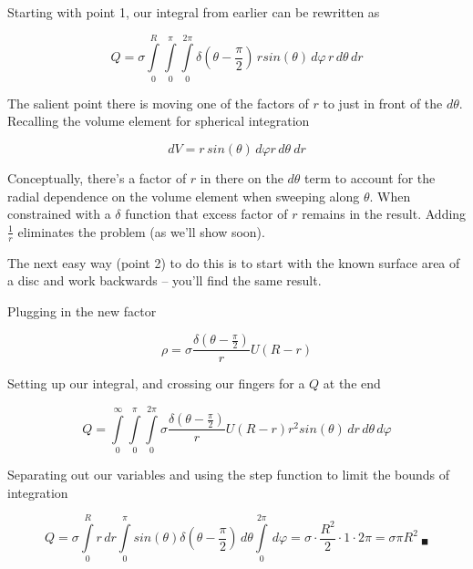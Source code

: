 Starting with point 1, our integral from earlier can be rewritten as 

\begin{equation}
  Q =
  \sigma
  \int\limits_0^R
  \int\limits_0^\pi
  \int\limits_0^{2\pi}
  \delta(\theta - \frac \pi 2)
  \,r sin(\theta) \, d\varphi
  \,r \, d\theta
  \, dr
\end{equation}

The salient point there is moving one of the factors of $r$ to just in
front of the $d\theta$.  Recalling the volume element for spherical
integration

\begin{equation}
  dV = r\,sin(\theta)\,d\varphi r\,d\theta\ dr
\end{equation}

Conceptually, there's a factor of $r$ in there on the $d\theta$ term
to account for the radial dependence on the volume element when
sweeping along $\theta$. When constrained with a $\delta$ function
that excess factor of $r$ remains in the result.  Adding $\frac 1 r$
eliminates the problem (as we'll show soon).

The next easy way (point 2) to do this is to start with the known
surface area of a disc and work backwards -- you'll find the same
result.

Plugging in the new factor

\begin{equation}
  \rho = \sigma \frac{\delta(\theta - \frac \pi 2)}{r} U(R - r)
\end{equation}

Setting up our integral, and crossing our fingers for a $Q$ at the end

\begin{equation}
  Q =
  \int\limits_0^\infty
  \int\limits_0^\pi
  \int\limits_0^{2\pi}
  \sigma \frac{\delta(\theta - \frac \pi 2)}{r} U(R - r)
  r^2sin(\theta)
  \, dr
  \, d\theta
  \, d\varphi
\end{equation}

Separating out our variables and using the step function to limit the
bounds of integration

\begin{equation}
  Q =
  \sigma
  \int\limits_0^R
  r
  \, dr
  \int\limits_0^\pi
  sin(\theta)
  \delta(\theta - \frac \pi 2)
  \, d\theta
  \int\limits_0^{2\pi}
  \, d\varphi
  = \sigma \cdot \frac{R^2}{2} \cdot 1 \cdot 2\pi
  = \sigma \pi R^2
  \ _\blacksquare
\end{equation}
